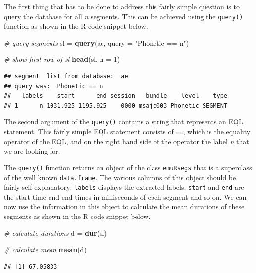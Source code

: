 \documentclass[]{book}
\newenvironment{Shaded}{\begin{snugshade}}{\end{snugshade}}
\newcommand{\CommentTok}[1]{\textcolor[rgb]{0.56,0.35,0.01}{\textit{#1}}}
\newcommand{\DataTypeTok}[1]{\textcolor[rgb]{0.13,0.29,0.53}{#1}}
\newcommand{\DecValTok}[1]{\textcolor[rgb]{0.00,0.00,0.81}{#1}}
\newcommand{\KeywordTok}[1]{\textcolor[rgb]{0.13,0.29,0.53}{\textbf{#1}}}
\newcommand{\NormalTok}[1]{#1}
\newcommand{\StringTok}[1]{\textcolor[rgb]{0.31,0.60,0.02}{#1}}
\theoremstyle{definition}
\theoremstyle{definition}
\theoremstyle{definition}
\theoremstyle{remark}
\begin{document}
The first thing that has to be done to address this fairly simple
question is to query the database for all \emph{n} segments. This can be
achieved using the \texttt{query()} function as shown in the R code
snippet below.

\begin{Shaded}
\begin{Highlighting}[]
\CommentTok{# query segments}
\NormalTok{sl =}\StringTok{ }\KeywordTok{query}\NormalTok{(ae, }\DataTypeTok{query =} \StringTok{"Phonetic == n"}\NormalTok{)}

\CommentTok{# show first row of sl}
\KeywordTok{head}\NormalTok{(sl, }\DataTypeTok{n =} \DecValTok{1}\NormalTok{)}
\end{Highlighting}
\end{Shaded}

\begin{verbatim}
## segment  list from database:  ae 
## query was:  Phonetic == n 
##   labels    start      end session   bundle    level    type
## 1      n 1031.925 1195.925    0000 msajc003 Phonetic SEGMENT
\end{verbatim}

The second argument of the \texttt{query()} contains a string that
represents an EQL statement. This fairly simple EQL statement consists
of \texttt{==}, which is the equality operator of the EQL, and on the
right hand side of the operator the label \emph{n} that we are looking
for.

The \texttt{query()} function returns an object of the class
\texttt{emuRsegs} that is a superclass of the well known
\texttt{data.frame}. The various columns of this object should be fairly
self-explanatory: \texttt{labels} displays the extracted labels,
\texttt{start} and \texttt{end} are the start time and end times in
milliseconds of each segment and so on. We can now use the information
in this object to calculate the mean durations of these segments as
shown in the R code snippet below.

\begin{Shaded}
\begin{Highlighting}[]
\CommentTok{# calculate durations}
\NormalTok{d =}\StringTok{ }\KeywordTok{dur}\NormalTok{(sl)}

\CommentTok{# calculate mean}
\KeywordTok{mean}\NormalTok{(d)}
\end{Highlighting}
\end{Shaded}

\begin{verbatim}
## [1] 67.05833
\end{verbatim}
\end{document}
